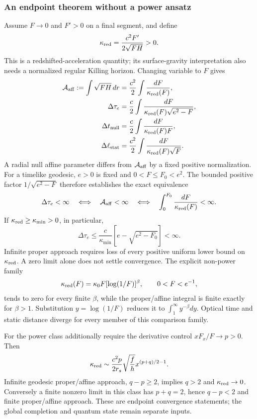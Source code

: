 \documentclass[10pt,twocolumn,letterpaper]{article}
\begin{document}
\subsubsection{An endpoint theorem without a power ansatz}
Assume $F\to0$ and $F'>0$ on a final segment, and define
\[
 \kappa_{\rm red}=\frac{c^2F'}{2\sqrt{FH}}>0.
\]
This is a redshifted-acceleration quantity; its surface-gravity
interpretation also needs a normalized regular Killing horizon.
Changing variable to $F$ gives
\begin{align}
 {\cal A}_{\rm aff}:=\int\sqrt{FH}\,dr
   &=\frac{c^2}{2}\int\frac{dF}{\kappa_{\rm red}(F)},\nonumber\\
 \Delta\tau_e
   &=\frac c2\int\frac{dF}{\kappa_{\rm red}(F)\sqrt{e^2-F}},\nonumber\\
 \Delta t_{\rm null}
   &=\frac c2\int\frac{dF}{\kappa_{\rm red}(F)F},\nonumber\\
 \Delta\ell_{\rm stat}
   &=\frac{c^2}{2}\int\frac{dF}{\kappa_{\rm red}(F)\sqrt F}.
 \label{eq:ch5-kappa-integrals}
\end{align}
A radial null affine parameter differs from ${\cal A}_{\rm aff}$ by a
fixed positive normalization. For a timelike geodesic, $e>0$ is fixed
and $0<F\leq F_0<e^2$. The bounded positive factor
$1/\sqrt{e^2-F}$ therefore establishes the exact equivalence
\[
 \Delta\tau_e<\infty
 \quad\Longleftrightarrow\quad {\cal A}_{\rm aff}<\infty
 \quad\Longleftrightarrow\quad
 \int_0^{F_0}\frac{dF}{\kappa_{\rm red}(F)}<\infty.
\]
If $\kappa_{\rm red}\geq\kappa_{\min}>0$, in particular,
\[
 \Delta\tau_e\leq\frac c{\kappa_{\min}}
       [e-\sqrt{e^2-F_0}]<\infty.
\]
Infinite proper approach requires loss of every positive uniform lower
bound on $\kappa_{\rm red}$. A zero limit alone does not settle
convergence. The explicit non-power family
\[
 \kappa_{\rm red}(F)=\kappa_0F[\log(1/F)]^\beta,
 \qquad 0<F<e^{-1},
\]
tends to zero for every finite $\beta$, while the proper/affine integral
is finite exactly for $\beta>1$. Substitution $y=\log(1/F)$ reduces it
to $\int_1^\infty y^{-\beta}dy$. Optical time and static distance
diverge for every member of this comparison family.

For the power class additionally require the derivative control
$xF_x/F\to p>0$. Then
\[
 \kappa_{\rm red}\sim\frac{c^2p}{2r_s}\sqrt{\frac fh}
          x^{(p+q)/2-1}.
\]
Infinite geodesic proper/affine approach, $q-p\geq2$, implies $q>2$
and $\kappa_{\rm red}\to0$. Conversely a finite nonzero limit in this
class has $p+q=2$, hence $q-p<2$ and finite proper/affine approach.
These are endpoint convergence statements; the global completion and
quantum state remain separate inputs.
\end{document}
